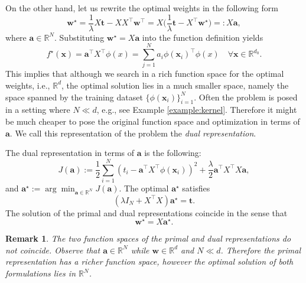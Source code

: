 \documentclass[11pt]{article}
\newcommand{\w}{\textbf{w}}
\newcommand{\x}{\textbf{x}}
\newcommand{\R}{\mathbb{R}}
\newcommand{\bo}[1]{{\mathbf #1}}
\newtheorem{remark}{Remark}[section]
\begin{document}
On the other hand, let us rewrite the optimal weights in the following form
\begin{equation}
  \w^\star = \frac{1}{\lambda} X \bo{t} - X X^\top \w^\top
  = X \Big( \frac{1}{\lambda} \bo{t} - X^\top \w^\star \Big) =: X \bo{a},
\end{equation}
where $\bo{a} \in \R^{N}$. Substituting $\w^\star = X \bo{a}$ into
the function definition yields
\begin{equation}
  f^\star(\x) = \bo{a}^\top X^\top \phi(x) = \sum_{j=1}^{N} a_i
  \phi(\x_i)^\top \phi(x) \quad \forall \x \in \R^{d_0}.
\end{equation}
This implies that although we search in a rich function space for the
optimal weights, i.e., $\R^d$, the optimal solution lies in a much
smaller space, namely the space spanned by the training dataset
$\{\phi(\x_i)\}_{i=1}^{N}$. Often the problem is posed in a setting
where $N \ll d$, e.g., see Example \ref{example:kernel}. Therefore it
might be much cheaper to pose the original function space and
optimization in terms of $\bo{a}$. We call this representation of the
problem the {\it dual representation}.

The dual representation in terms of $\bo{a}$ is the following:
\begin{equation}
  J(\bo{a}) := \frac12 \sum_{i=1}^{N} (t_i -
  \bo{a}^\top X^\top  \phi(\x_i))^2 +
  \frac{\lambda}{2} \bo{a}^\top X^\top X \bo{a},
\end{equation}
and $\bo{a}^\star := \arg\min_{\bo{a}\in\R^N} J(\bo{a})$.
The optimal $\bo{a}^\star$ satisfies
\begin{equation}
  (\lambda I_N + X^\top X) \bo{a}^\star = \bo{t}.
\end{equation}
The solution of the primal and dual representations coincide in the
sense that
\begin{equation}
  \bo{w}^\star = X \bo{a}^\star.
\end{equation}
\begin{remark}
  The two function spaces of the primal and dual representations do
  not coincide. Observe that $\bo{a}\in\R^N$ while $\w \in \R^d$ and
  $N \ll d$. Therefore the primal representation has a richer function
  space, however the optimal solution of both formulations lies in $\R^N$.
\end{remark}
\end{document}
